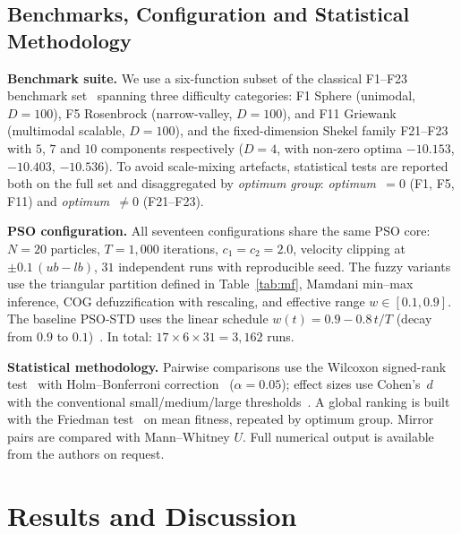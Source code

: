 \documentclass[runningheads]{llncs}
\begin{document}
% 

\subsection{Benchmarks, Configuration and Statistical Methodology}

\textbf{Benchmark suite.} We use a six-function subset of the classical F1--F23 benchmark set~\cite{abualigah2021aoa} spanning three difficulty categories: F1 Sphere (unimodal, $D=100$), F5 Rosenbrock (narrow-valley, $D=100$), and F11 Griewank (multimodal scalable, $D=100$), and the fixed-dimension Shekel family F21--F23 with $5$, $7$ and $10$ components respectively ($D=4$, with non-zero optima $-10.153$, $-10.403$, $-10.536$). To avoid scale-mixing artefacts, statistical tests are reported both on the full set and disaggregated by \textit{optimum group}: \textit{optimum~$=0$} (F1, F5, F11) and \textit{optimum~$\neq 0$} (F21--F23).

\textbf{PSO configuration.} All seventeen configurations share the same PSO core: $N=20$ particles, $T=1{,}000$ iterations, $c_1=c_2=2.0$, velocity clipping at $\pm 0.1\,(ub-lb)$, $31$ independent runs with reproducible seed. The fuzzy variants use the triangular partition defined in Table~\ref{tab:mf}, Mamdani min--max inference, COG defuzzification with rescaling, and effective range $w \in [0.1, 0.9]$. The baseline PSO-STD uses the linear schedule $w(t) = 0.9 - 0.8\,t/T$ (decay from $0.9$ to $0.1$)~\cite{shi1998}. In total: $17 \times 6 \times 31 = 3{,}162$ runs.

\textbf{Statistical methodology.} Pairwise comparisons use the Wilcoxon signed-rank test~\cite{wilcoxon1945} with Holm--Bonferroni correction~\cite{holm1979} ($\alpha=0.05$); effect sizes use Cohen's~$d$ with the conventional small/medium/large thresholds~\cite{cohen1988}. A global ranking is built with the Friedman test~\cite{friedman1937} on mean fitness, repeated by optimum group. Mirror pairs are compared with Mann--Whitney $U$. Full numerical output is available from the authors on request.

\section{Results and Discussion}\label{sec:results}
\end{document}
